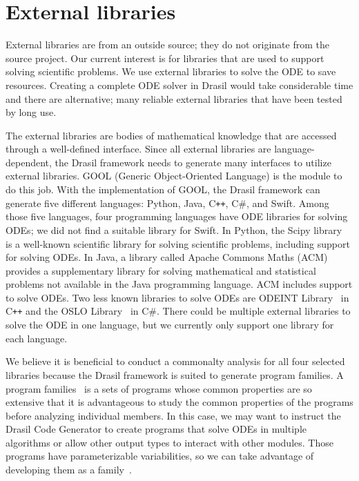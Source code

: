 \chapter{External libraries}
\label{cha_extlib}
External libraries are from an outside source; they do not originate from the source project. Our current interest is for libraries that are used to support solving scientific problems. We use external libraries to solve the ODE to save resources. Creating a complete ODE solver in Drasil would take 
considerable time and there are alternative; many reliable external libraries that have been tested by long use. 

The external libraries are bodies of mathematical knowledge that are accessed through a well-defined interface. Since all external libraries are language-dependent, the Drasil framework needs to generate many interfaces to utilize external libraries. GOOL (Generic Object-Oriented Language) is the module to do this job. With the implementation of GOOL, the Drasil framework can generate five different languages: Python, Java, C\texttt{++}, C\#, and Swift. Among those five languages, four programming languages have ODE libraries for solving ODEs; we did not find a suitable library for Swift. In Python, the Scipy library~\citep{scipy} is a well-known scientific library for solving scientific problems, including support for solving ODEs. In Java, a library called Apache Commons Maths (ACM)~\citep{apache} provides a supplementary library for solving mathematical and statistical problems not available in the Java programming language. ACM includes support to solve ODEs. Two less known libraries to solve ODEs are ODEINT Library~\citep{odeint} in C\texttt{++} and the OSLO Library~\citep{oslo} in C\#. There could be multiple external libraries to solve the ODE in one language, but we currently only support one library for each language.

We believe it is beneficial to conduct a commonalty analysis for all four selected libraries because the Drasil framework is suited to generate program families. A program families~\citep{dp1976} is a sets of programs whose common properties are so extensive that it is advantageous to study the common properties of the programs before analyzing individual members. In this case, we may want to instruct the Drasil Code Generator to create programs that solve ODEs in multiple algorithms or allow other output types to interact with other modules. Those programs have parameterizable variabilities, so we can take advantage of developing them as a family~\citep{ss2004}.

